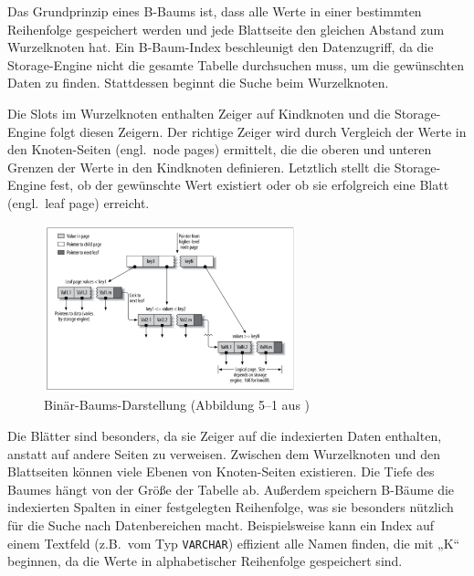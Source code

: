 Das Grundprinzip eines B-Baums ist, dass alle Werte in einer bestimmten Reihenfolge gespeichert werden und jede Blattseite den gleichen Abstand zum Wurzelknoten hat.
Ein B-Baum-Index beschleunigt den Datenzugriff, da die Storage-Engine nicht die gesamte Tabelle durchsuchen muss, um die gewünschten Daten zu finden.
Stattdessen beginnt die Suche beim Wurzelknoten.

Die Slots im Wurzelknoten enthalten Zeiger auf Kindknoten und die Storage-Engine folgt diesen Zeigern.
Der richtige Zeiger wird durch Vergleich der Werte in den Knoten-Seiten (engl.\ node pages) ermittelt, die die oberen und unteren Grenzen der Werte in den Kindknoten definieren.
Letztlich stellt die Storage-Engine fest, ob der gewünschte Wert existiert oder ob sie erfolgreich eine Blatt (engl.\ leaf page) erreicht.

\vspace{-8pt}
\begin{figure}[H]
    \centering
    \includegraphics[width=0.65\textwidth]{PNGs/Textbook/B_Tree_Visualisation}
    \caption[Binärbaum-Visualisierung]{Binär-Baums-Darstellung (Abbildung 5--1 aus \cite[S. 149]{schwartz2012high})}
    \label{fig:b-tree-visualisation}
\end{figure}
\vspace{-20pt}

Die Blätter sind besonders, da sie Zeiger auf die indexierten Daten enthalten, anstatt auf andere Seiten zu verweisen.
Zwischen dem Wurzelknoten und den Blattseiten können viele Ebenen von Knoten-Seiten existieren.
Die Tiefe des Baumes hängt von der Größe der Tabelle ab.
Außerdem speichern B-Bäume die indexierten Spalten in einer festgelegten Reihenfolge, was sie besonders nützlich für die Suche nach Datenbereichen macht.
Beispielsweise kann ein Index auf einem Textfeld (z.B.\ vom Typ \texttt{VARCHAR}) effizient alle Namen finden, die mit „K“ beginnen, da die Werte in alphabetischer Reihenfolge gespeichert sind.

